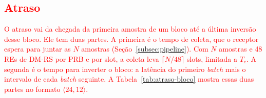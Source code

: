\subsection{\texorpdfstring{\textcolor{red}{Atraso}}{Atraso}}
\textcolor{red}{O atraso vai da chegada da primeira amostra de um bloco até a última inversão desse bloco. Ele tem duas partes. A primeira é o tempo de coleta, que o receptor espera para juntar as $N$ amostras (Seção~\ref{subsec:pipeline}). Com $N$ amostras e 48 REs de DM-RS por PRB e por slot, a coleta leva $\lceil N/48 \rceil$ slots, limitada a $T_c$. A segunda é o tempo para inverter o bloco: a latência do primeiro \textit{batch} mais o intervalo de cada \textit{batch} seguinte. A Tabela~\ref{tab:atraso-bloco} mostra essas duas partes no formato $\langle 24, 12\rangle$.}

